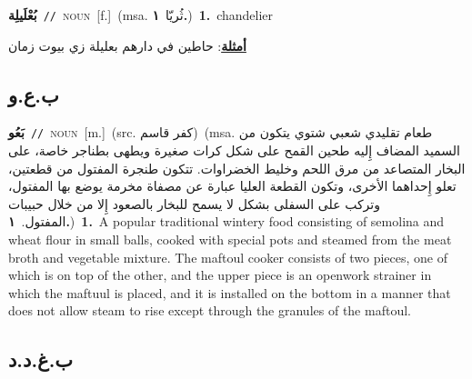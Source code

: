 \documentclass[10pt,a4paper,twoside]{article} %
\begin{document}
\begin{multicols}{2}
{\setlength\topsep{0pt}\textbf{\foreignlanguage{arabic}{بُعْلَيلِة}}\ {\color{gray}\texttt{//}\color{black}}\ \textsc{noun}\ [f.]\ \color{gray}(msa. \foreignlanguage{arabic}{ثُريّا}~\foreignlanguage{arabic}{\textbf{١.}})\color{black}\ \textbf{1.}~chandelier\  \begin{flushright}\color{gray}\foreignlanguage{arabic}{\textbf{\underline{\foreignlanguage{arabic}{أمثلة}}}: حاطين في دارهم بعليلة زي بيوت زمان}\end{flushright}\color{black}} \vspace{2mm}

\vspace{-3mm}
\subsection*{\color{blue}\foreignlanguage{arabic}{ب.ع.و}\color{blue}{}} 

{\setlength\topsep{0pt}\textbf{\foreignlanguage{arabic}{بَعُو}}\ {\color{gray}\texttt{//}\color{black}}\ \textsc{noun}\ [m.]\ (src. \color{gray}\foreignlanguage{arabic}{كفر قاسم}\color{black})\ \color{gray}(msa. \foreignlanguage{arabic}{طعام تقليدي شعبي شتوي يتكون من السميد المضاف إِليه طحين القمح على شكل كرات صغيرة ويطهى بطناجر خاصة، على البخار المتصاعد من مرق اللحم وخليط الخضراوات. تتكون طنجرة المفتول من قطعتين، تعلو إِحداهما الأخرى، وتكون القطعة العليا عبارة عن مصفاة مخرمة يوضع بها المفتول، وتركب على السفلى بشكل لا يسمح للبخار بالصعود إِلا من خلال حبيبات المفتول.}~\foreignlanguage{arabic}{\textbf{١.}})\color{black}\ \textbf{1.}~A popular traditional wintery food consisting of semolina and wheat flour in small balls, cooked with special pots and steamed from the meat broth and vegetable mixture. The maftoul cooker consists of two pieces, one of which is on top of the other, and the upper piece is an openwork strainer in which the maftuul is placed, and it is installed on the bottom in a manner that does not allow steam to rise except through the granules of the maftoul.\ } \vspace{2mm}

\vspace{-3mm}
\subsection*{\color{blue}\foreignlanguage{arabic}{ب.غ.د.د}\color{blue}{}} 


\end{multicols}
\end{document}
